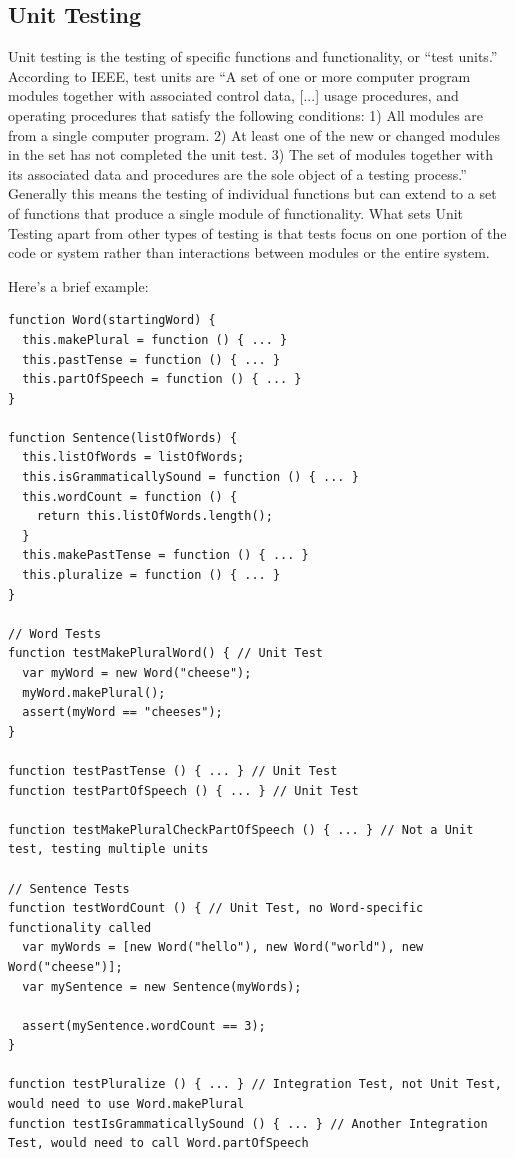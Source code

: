 \documentclass[12pt]{ucthesis}
\begin{document}
\subsection{Unit Testing}
Unit testing is the testing of specific functions and functionality, or ``test units.'' According to IEEE, test units are ``A set of one or more computer program modules together with associated control data, [...] usage procedures, and operating procedures that satisfy the following conditions: 1) All modules are from a single computer program. 2) At least one of the new or changed modules in the set has not completed the unit test. 3) The set of modules together with its associated data and procedures are the sole object of a testing process.'' \cite{UnitTestDefinition} Generally this means the testing of individual functions but can extend to a set of functions that produce a single module of functionality. What sets Unit Testing apart from other types of testing is that tests focus on one portion of the code or system rather than interactions between modules or the entire system.

Here's a brief example:
\begin{lstlisting}
function Word(startingWord) {
  this.makePlural = function () { ... }
  this.pastTense = function () { ... }
  this.partOfSpeech = function () { ... }
}

function Sentence(listOfWords) {
  this.listOfWords = listOfWords;
  this.isGrammaticallySound = function () { ... }
  this.wordCount = function () {
    return this.listOfWords.length();
  }
  this.makePastTense = function () { ... }
  this.pluralize = function () { ... }
}

// Word Tests
function testMakePluralWord() { // Unit Test
  var myWord = new Word("cheese");
  myWord.makePlural();
  assert(myWord == "cheeses");
}

function testPastTense () { ... } // Unit Test
function testPartOfSpeech () { ... } // Unit Test

function testMakePluralCheckPartOfSpeech () { ... } // Not a Unit test, testing multiple units

// Sentence Tests
function testWordCount () { // Unit Test, no Word-specific functionality called
  var myWords = [new Word("hello"), new Word("world"), new Word("cheese")];
  var mySentence = new Sentence(myWords);

  assert(mySentence.wordCount == 3);
}

function testPluralize () { ... } // Integration Test, not Unit Test, would need to use Word.makePlural
function testIsGrammaticallySound () { ... } // Another Integration Test, would need to call Word.partOfSpeech

\end{lstlisting}
\end{document}

